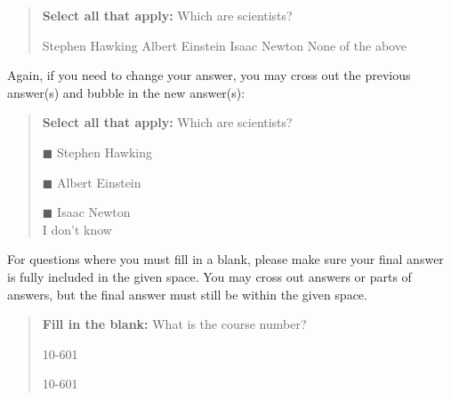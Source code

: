 \documentclass[11pt,addpoints,answers]{exam}
\begin{document}
\begin{quote}
\textbf{Select all that apply:} Which are scientists?
{
    \checkboxchar{$\Box$} \checkedchar{$\blacksquare$}
    \begin{checkboxes}
     \choice Stephen Hawking 
     \CorrectChoice Albert Einstein
     \choice Isaac Newton
     \choice None of the above
    \end{checkboxes}
    }
\end{quote}

Again, if you need to change your answer, you may cross out the previous answer(s) and bubble in the new answer(s):

\begin{quote}
\textbf{Select all that apply:} Which are scientists?
    \begin{list}{}
    \item $\blacksquare$ Stephen Hawking 
    \item $\blacksquare$ Albert Einstein
    \item $\blacksquare$ Isaac Newton\\
    \xcancel{$\blacksquare$} I don't know
\end{list}
\end{quote}

For questions where you must fill in a blank, please make sure your final answer is fully included in the given space. You may cross out answers or parts of answers, but the final answer must still be within the given space.

\begin{quote}
\textbf{Fill in the blank:} What is the course number?

\begin{tcolorbox}[fit,height=1cm, width=4cm, blank, borderline={1pt}{-2pt},nobeforeafter]
    \begin{center}\huge10-601\end{center}
    \end{tcolorbox}\hspace{2cm}
    \begin{tcolorbox}[fit,height=1cm, width=4cm, blank, borderline={1pt}{-2pt},nobeforeafter]
    \begin{center}\huge10-601\end{center}
    \end{tcolorbox}
\end{quote}

\clearpage\clearpage
\end{document}
